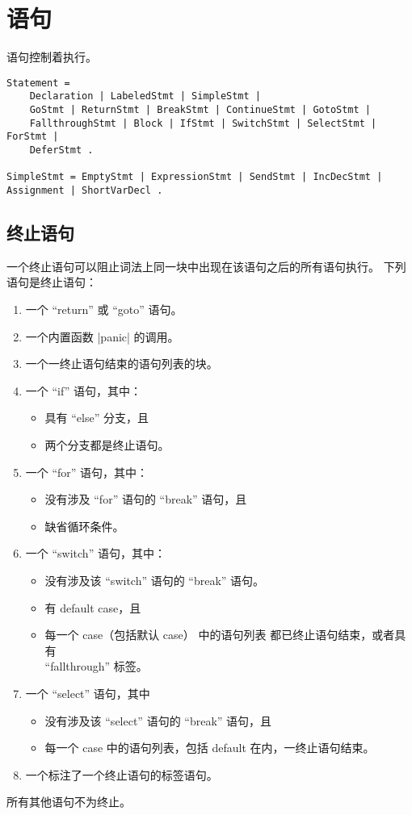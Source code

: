\chapter{语句}
语句控制着执行。
\begin{lstlisting}[language=EBNF, style=EBNF]
Statement =
	Declaration | LabeledStmt | SimpleStmt |
	GoStmt | ReturnStmt | BreakStmt | ContinueStmt | GotoStmt |
	FallthroughStmt | Block | IfStmt | SwitchStmt | SelectStmt | ForStmt |
	DeferStmt .

SimpleStmt = EmptyStmt | ExpressionStmt | SendStmt | IncDecStmt | Assignment | ShortVarDecl .
\end{lstlisting}

\section{终止语句}
一个终止语句可以阻止词法上同一块中出现在该语句之后的所有语句执行。
下列语句是终止语句：
\begin{enumerate}
\item 一个 ``return'' 或 ``goto'' 语句。
\item 一个内置函数 \code|panic| 的调用。
\item 一个一终止语句结束的语句列表的块。
\item 一个 ``if'' 语句，其中：
	\begin{itemize}
	\item 具有 ``else'' 分支，且
	\item 两个分支都是终止语句。
	\end{itemize}
\item 一个 ``for'' 语句，其中：
	\begin{itemize}
	\item 没有涉及 ``for'' 语句的 ``break'' 语句，且
	\item 缺省循环条件。
	\end{itemize}
\item 一个  ``switch'' 语句，其中：
	\begin{itemize}
	\item 没有涉及该 ``switch'' 语句的 ``break'' 语句。
	\item 有 default case，且
	\item 每一个 case（包括默认 case） 中的语句列表 都已终止语句结束，或者具有 \\  ``fallthrough'' 标签。
	\end{itemize}
\item 一个 ``select'' 语句，其中
	\begin{itemize}
	\item 没有涉及该 ``select'' 语句的 ``break'' 语句，且
	\item 每一个 case 中的语句列表，包括 default 在内，一终止语句结束。
	\end{itemize}
\item 一个标注了一个终止语句的标签语句。
\end{enumerate}
所有其他语句不为终止。


